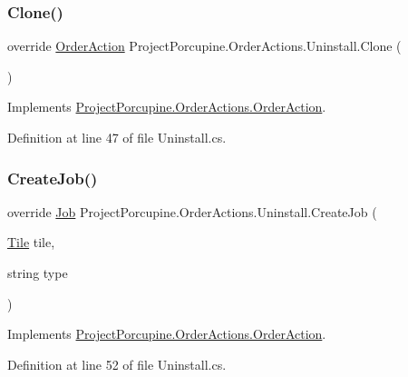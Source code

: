 \subsubsection{\texorpdfstring{Clone()}{Clone()}}
{\footnotesize\ttfamily override \hyperlink{class_project_porcupine_1_1_order_actions_1_1_order_action}{Order\+Action} Project\+Porcupine.\+Order\+Actions.\+Uninstall.\+Clone (\begin{DoxyParamCaption}{ }\end{DoxyParamCaption})\hspace{0.3cm}{\ttfamily [virtual]}}



Implements \hyperlink{class_project_porcupine_1_1_order_actions_1_1_order_action_a34bd9be15055adc6c5397db3aab7bc5f}{Project\+Porcupine.\+Order\+Actions.\+Order\+Action}.



Definition at line 47 of file Uninstall.\+cs.

\mbox{\label{class_project_porcupine_1_1_order_actions_1_1_uninstall_a24d59eabcb853fd7b3e84ba1c10568fc}} 
\subsubsection{\texorpdfstring{Create\+Job()}{CreateJob()}}
{\footnotesize\ttfamily override \hyperlink{class_job}{Job} Project\+Porcupine.\+Order\+Actions.\+Uninstall.\+Create\+Job (\begin{DoxyParamCaption}\item[{\hyperlink{class_tile}{Tile}}]{tile,  }\item[{string}]{type }\end{DoxyParamCaption})\hspace{0.3cm}{\ttfamily [virtual]}}



Implements \hyperlink{class_project_porcupine_1_1_order_actions_1_1_order_action_a84f0d2817e07e351c4a9e86172d8f5b4}{Project\+Porcupine.\+Order\+Actions.\+Order\+Action}.



Definition at line 52 of file Uninstall.\+cs.

